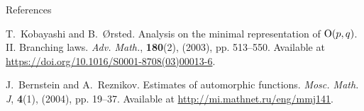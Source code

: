 \documentclass[notes,notheorems]{beamer}
\theoremstyle{definition}
\theoremstyle{example}
\theoremstyle{remark}
\theoremstyle{mystyle}
\begin{document}
\begin{frame}[allowframebreaks]{References}
\begin{thebibliography}{KØSS15}
T.~Kobayashi and B.~{\O}rsted.
\newblock Analysis on the minimal representation of\/ {$\mbox{\rm O}(p,q)$}.{$\;$}{{\rm{II}}}. {B}ranching laws.
\newblock \emph{Adv. Math.}, \textbf{180}(2), (2003), pp. 513--550.
Available at \url{https://doi.org/10.1016/S0001-8708(03)00013-6}.

J.~Bernstein and A.~Reznikov.
\newblock Estimates of automorphic functions.
\newblock \emph{Mosc. Math. J}, \textbf{\textbf{4}}(1), (2004), pp. 19--37.
Available at \url{http://mi.mathnet.ru/eng/mmj141}.
\end{thebibliography}
\end{frame}
\end{document}
